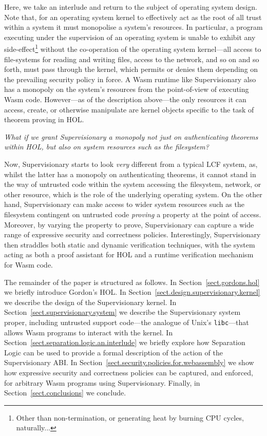 \documentclass[a4paper, 10pt]{article}
\begin{document}
Here, we take an interlude and return to the subject of operating system design.
Note that, for an operating system kernel to effectively act as the root of all trust within a system it must monopolise a system's resources.
In particular, a program executing under the supervision of an operating system is unable to exhibit any side-effect\footnote{Other than non-termination, or generating heat by burning CPU cycles, naturally...} without the co-operation of the operating system kernel---all access to file-systems for reading and writing files, access to the network, and so on and so forth, must pass through the kernel, which permits or denies them depending on the prevailing security policy in force.
A Wasm runtime like Supervisionary also has a monopoly on the system's resources from the point-of-view of executing Wasm code.
However---as of the description above---the only resources it can access, create, or otherwise manipulate are kernel objects specific to the task of theorem proving in HOL.

\emph{What if we grant Supervisionary a monopoly not just on authenticating theorems within HOL, but also on system resources such as the filesystem?}

Now, Supervisionary starts to look \emph{very} different from a typical LCF system, as, whilst the latter has a monopoly on authenticating theorems, it cannot stand in the way of untrusted code within the system accessing the filesystem, network, or other resource, which is the role of the underlying operating system.
On the other hand, Supervisionary can make access to wider system resources such as the filesystem contingent on untrusted code \emph{proving} a property at the point of access.
Moreover, by varying the property to prove, Supervisionary can capture a wide range of expressive security and correctness policies.
Interestingly, Supervisionary then straddles both static and dynamic verification techniques, with the system acting as both a proof assistant for HOL and a runtime verification mechanism for Wasm code.

The remainder of the paper is structured as follows.
In Section~\ref{sect.gordons.hol} we briefly introduce Gordon's HOL.
In Section~\ref{sect.design.supervisionary.kernel} we describe the design of the Supervisionary kernel.
In Section~\ref{sect.supervisionary.system} we describe the Supervisionary system proper, including untrusted support code---the analogue of Unix's \texttt{libc}---that allows Wasm programs to interact with the kernel.
In Section~\ref{sect.separation.logic.an.interlude} we briefly explore how Separation Logic can be used to provide a formal description of the action of the Supervisionary ABI.
In Section~\ref{sect.security.policies.for.webassembly} we show how expressive security and correctness policies can be captured, and enforced, for arbitrary Wasm programs using Supervisionary.
Finally, in Section~\ref{sect.conclusions} we conclude.
\end{document}

